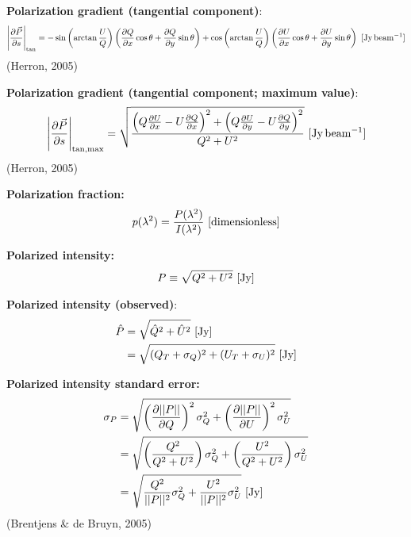 \documentclass[a4paper,10pt]{article}
\begin{document}
{\noindent}\textbf{Polarization gradient (tangential component)}:
\begin{align*}
	\left\lvert\dfrac{\partial\vec{P}}{\partial s}\right\rvert_\mathrm{tan} = -\sin\left(\arctan\frac{U}{Q}\right)\left(\frac{\partial Q}{\partial x}\cos\theta+\frac{\partial Q}{\partial y}\sin\theta\right) + \cos\left(\arctan\frac{U}{Q}\right)\left(\frac{\partial U}{\partial x}\cos\theta+\frac{\partial U}{\partial y}\sin\theta\right) ~ [\rm Jy\,beam^{-1}]
\end{align*}
(Herron, 2005)

{\noindent}\textbf{Polarization gradient (tangential component; maximum value)}:
\begin{align*}
	\left\lvert\dfrac{\partial\vec{P}}{\partial s}\right\rvert_\mathrm{tan,max} = \sqrt{\frac{\left(Q\frac{\partial U}{\partial x}-U\frac{\partial Q}{\partial x}\right)^2 +\left(Q\frac{\partial U}{\partial y}-U\frac{\partial Q}{\partial y}\right)^2}{Q^2+U^2}} ~ [\rm Jy\,beam^{-1}]
\end{align*}
(Herron, 2005)

{\noindent}\textbf{Polarization fraction:}
\begin{align*}
p(\lambda^2) = \dfrac{P(\lambda^2)}{I(\lambda^2)} ~ [{\rm dimensionless}]
\end{align*}

{\noindent}\textbf{Polarized intensity:}
\begin{align*}
    P\equiv\sqrt{Q^2+U^2} ~ [\rm Jy]
\end{align*}

{\noindent}\textbf{Polarized intensity (observed)}:
\begin{align*}
    \hat{P} &= \sqrt{\hat{Q}^2+\hat{U}^2} ~ [\rm Jy] \\
                &= \sqrt{(Q_T+\sigma_Q)^2+(U_T+\sigma_U)^2} ~ [\rm Jy]
\end{align*}

{\noindent}\textbf{Polarized intensity standard error:}
\begin{align*}
\sigma_P &= \sqrt{ \left(\dfrac{\partial\lvert\lvert P \rvert\rvert}{\partial Q}\right)^2\sigma_Q^2 + \left(\dfrac{\partial\lvert\lvert P \rvert\rvert}{\partial U}\right)^2\sigma_U^2 } \\
&= \sqrt{ \left(\dfrac{Q^2}{Q^2+U^2}\right)\sigma_Q^2 + \left(\dfrac{U^2}{Q^2+U^2}\right)\sigma_U^2 } \\
&= \sqrt{ \dfrac{Q^2}{\lvert\lvert P \rvert\rvert^2}\sigma_Q^2 + \dfrac{U^2}{\lvert\lvert P \rvert\rvert^2}\sigma_U^2 } ~ [\rm Jy]
\end{align*}
(Brentjens \& de Bruyn, 2005)
\end{document}
